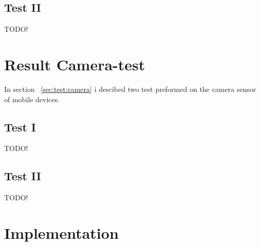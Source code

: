 \subsection{Test II}
TODO!

\section{Result Camera-test}
In section ~\ref{sec:test:camera} i descibed two test preformed on the camera sensor of mobile devices.
\subsection{Test I}
TODO!
\subsection{Test II}
TODO!

\section{Implementation}
